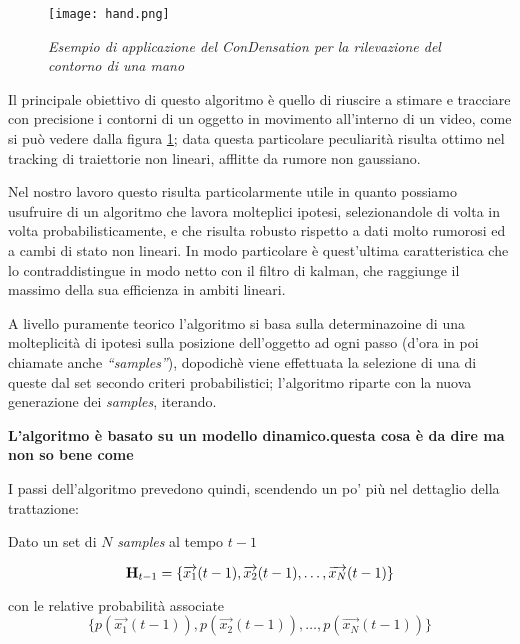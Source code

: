 \begin{figure}[hb]
\centering
	\texttt{[image: hand.png]}
\caption{\textit{Esempio di applicazione del ConDensation per la rilevazione del contorno di una mano}\label{fig:hand}}
\end{figure}

Il principale obiettivo di questo algoritmo è quello di riuscire a stimare e tracciare con precisione i contorni di un oggetto in movimento all'interno di un video, come si può vedere dalla figura \ref{fig:hand}; data questa particolare peculiarità risulta ottimo nel tracking di traiettorie non lineari, afflitte da rumore non gaussiano.



Nel nostro lavoro questo risulta particolarmente utile in quanto possiamo usufruire di un algoritmo che lavora molteplici ipotesi, selezionandole di volta in volta probabilisticamente, e che risulta robusto rispetto a dati molto rumorosi ed a cambi di stato non lineari. In modo particolare è quest'ultima caratteristica che lo contraddistingue in modo netto con il filtro di kalman, che raggiunge il massimo della sua efficienza in ambiti lineari.

A livello puramente teorico l'algoritmo si basa sulla determinazoine di una molteplicità di ipotesi sulla posizione dell'oggetto ad ogni passo (d'ora in poi chiamate anche \textit{``samples''}), dopodichè viene effettuata la selezione di una di queste dal set secondo criteri probabilistici; l'algoritmo riparte con la nuova generazione dei \textit{samples}, iterando. 

\textbf{L'algoritmo è basato su un modello dinamico.questa cosa è da dire ma non so bene come}


I passi dell'algoritmo prevedono quindi, scendendo un po' più nel dettaglio della trattazione: 

Dato un set di $N$ \textit{samples} al tempo $t-1$

\begin{equation}\label{eq:H}
\mbox{{\bfseries H}}_{t-1}= \lbrace \overrightarrow{x_1}(t-1),\overrightarrow{x_2}(t-1), \ldots,  \overrightarrow{x_N}(t-1) \rbrace
\end{equation} 

con le relative probabilità associate
\begin{equation}\label{eq:pH}
\lbrace p(\overrightarrow{x_1}(t-1)),p(\overrightarrow{x_2}(t-1)), \ldots, p( \overrightarrow{x_N}(t-1)) \rbrace
\end{equation} 

